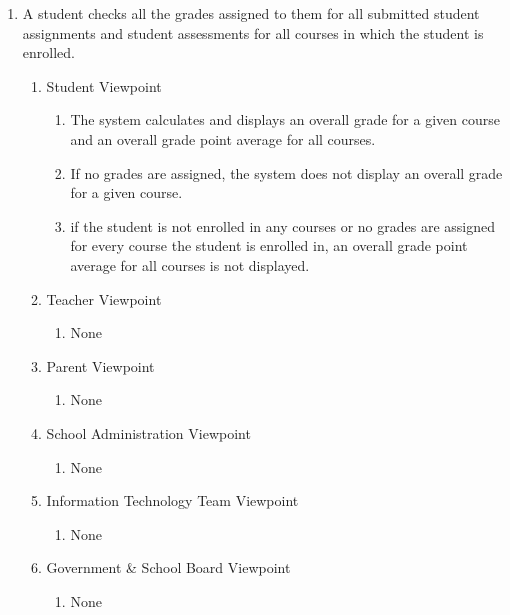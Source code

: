 \documentclass[]{article}
\begin{document}
\begin{enumerate}[{BE}1.]
	\item A student checks all the grades assigned to them for all submitted student assignments and student assessments for all courses in which the student is enrolled.
	\begin{enumerate}[{VP2}.1]
		\item Student Viewpoint
			\begin{enumerate}
				\item The system calculates and displays an overall grade for a given course and an overall grade point average for all courses.
				\item If no grades are assigned, the system does not display an overall grade for a given course.
				\item if the student is not enrolled in any courses or no grades are assigned for every course the student is enrolled in, an overall grade point average for all courses is not displayed.
			\end{enumerate}
		\item Teacher Viewpoint
			\begin{enumerate}
				\item None
			\end{enumerate}
		\item Parent Viewpoint
			\begin{enumerate}
				\item None
			\end{enumerate}
		\item School Administration Viewpoint
			\begin{enumerate}
				\item None
			\end{enumerate}
		\item Information Technology Team Viewpoint
			\begin{enumerate}
				\item None
			\end{enumerate}
		\item Government \& School Board Viewpoint
			\begin{enumerate}
				\item None
			\end{enumerate}
	\end{enumerate}


\end{enumerate}
\end{document}
